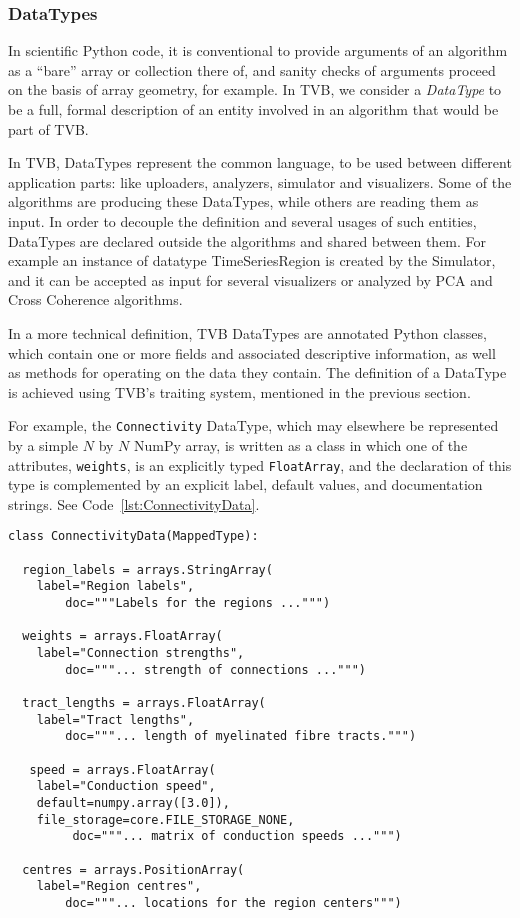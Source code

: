 	\subsubsection{DataTypes}
In scientific Python code, it is conventional to provide arguments
of an algorithm as a ``bare'' array or collection there of, and sanity
checks of arguments proceed on the basis of array geometry, for example.
In TVB, we consider a \textit{DataType} to be a full, formal description of 
an entity involved in an algorithm that would be part of TVB. 

In TVB, DataTypes represent the common language, to be used between different
application parts: like uploaders, analyzers, simulator and visualizers.
Some of the algorithms are producing these DataTypes, while others are reading
them as input.  In order to decouple the definition and several usages of such
entities, DataTypes are declared outside the algorithms and shared between them.
For example an instance of datatype TimeSeriesRegion is created by the
Simulator, and it can be accepted as input for several visualizers or analyzed
by PCA and Cross Coherence algorithms.

In a more technical definition, TVB DataTypes are annotated Python classes, which
contain one or more fields and associated descriptive information, as
well as methods for operating on the data they contain. The definition of a
DataType is achieved using TVB's traiting system, mentioned in the previous section.

For example, the \texttt{Connectivity} DataType, which may elsewhere
be represented by a simple $N$ by $N$ NumPy array, is written as a class
in which one of the attributes, \texttt{weights}, is an explicitly typed 
\texttt{FloatArray}, and the declaration of this type is complemented by
an explicit label, default values, and documentation strings. See
Code~\ref{lst:ConnectivityData}.

\begin{lstlisting}[caption={The COnnectivityData listing},
                   label={lst:ConnectivityData}]
class ConnectivityData(MappedType):

  region_labels = arrays.StringArray( 
	label="Region labels", 
        doc="""Labels for the regions ...""")

  weights = arrays.FloatArray( 
	label="Connection strengths",
        doc="""... strength of connections ...""")

  tract_lengths = arrays.FloatArray( 
	label="Tract lengths",
        doc="""... length of myelinated fibre tracts.""")

   speed = arrays.FloatArray( 
	label="Conduction speed", 
	default=numpy.array([3.0]), 
	file_storage=core.FILE_STORAGE_NONE,
         doc="""... matrix of conduction speeds ...""")

  centres = arrays.PositionArray( 
	label="Region centres",
        doc="""... locations for the region centers""")
\end{lstlisting}
	

